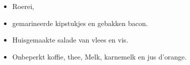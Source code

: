 \begin{itemize}
	\item Roerei,
	\item gemarineerde kipstukjes en gebakken bacon.
	\item Huisgemaakte salade van vlees en vis.
	\item Onbeperkt koffie, thee, Melk, karnemelk en jus d’orange.
\end{itemize}
